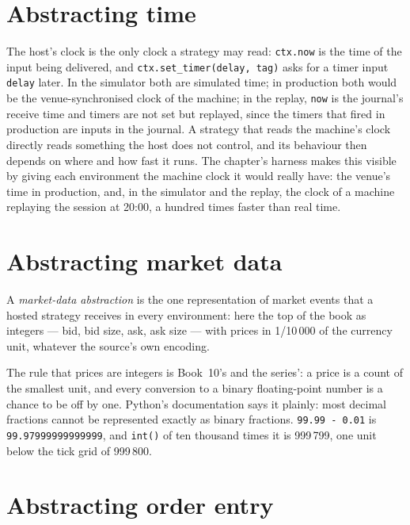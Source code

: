\section{Abstracting time}

The host's clock is the only clock a strategy may read: \texttt{ctx.now} is the time of the input being delivered, and
\texttt{ctx.set\_timer(delay, tag)} asks for a timer input \texttt{delay} later. In the simulator both are simulated time; in production
both would be the venue-synchronised clock of the machine; in the replay, \texttt{now} is the journal's receive time and timers are not set
but replayed, since the timers that fired in production are inputs in the journal. A strategy that reads the machine's clock directly reads
something the host does not control, and its behaviour then depends on where and how fast it runs. The chapter's harness makes this
visible by giving each environment the machine clock it would really have: the venue's time in production, and, in the simulator and the
replay, the clock of a machine replaying the session at 20:00, a hundred times faster than real time.

\section{Abstracting market data}

\begin{definition}\label{def:pl:simulation-production-parity:md}
A \emph{market-data abstraction} is the one representation of market events that a hosted strategy
receives in every environment: here the top of the book as integers --- bid, bid size, ask, ask size --- with prices in 1/10\,000 of the
currency unit, whatever the source's own encoding.
\end{definition}

The rule that prices are integers is Book~10's and the series': a price is a count of the smallest unit, and every conversion to a binary
floating-point number is a chance to be off by one. Python's documentation says it plainly: most decimal fractions cannot be represented
exactly as binary fractions. \texttt{99.99 - 0.01} is \texttt{99.97999999999999}, and \texttt{int()} of ten thousand times it is
999\,799, one unit below the tick grid of 999\,800.

\section{Abstracting order entry}

